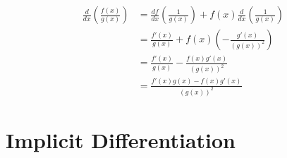 \begin{align*}
    \frac{d}{dx}\left(\frac{f(x)}{g(x)}\right) &= \frac{df}{dx}\left(\frac{1}{g(x)}\right) + f(x)\frac{d}{dx}\left(\frac{1}{g(x)}\right)\\
    &= \frac{f'(x)}{g(x)} + f(x)\left(- \frac{g'(x)}{(g(x))^2}\right)\\
    &= \frac{f'(x)}{g(x)} - \frac{f(x)g'(x)}{(g(x))^{2}}\\
    &= \frac{f'(x)g(x) - f(x)g'(x)}{(g(x))^{2}}
\end{align*}

\section{Implicit Differentiation}